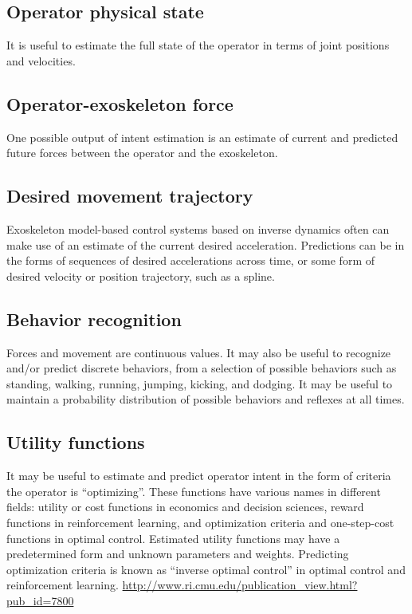\documentclass[letterpaper,12pt,fullpage]{article}
\begin{document}
\subsection{Operator physical state}

It is useful to estimate the full state of the operator in terms
of joint positions and velocities.

\subsection{Operator-exoskeleton force}

One possible output of intent estimation is an estimate of current
and predicted future forces between the operator and the exoskeleton.

\subsection{Desired movement trajectory}

Exoskeleton model-based control systems based on inverse dynamics often
can make use of an estimate of the current desired acceleration.
Predictions can be in the forms of sequences of desired accelerations
across time, or some form of desired velocity or position trajectory,
such as a spline.

\subsection{Behavior recognition}

Forces and movement are continuous values. It may also be useful to
recognize and/or predict discrete behaviors, from a selection of
possible behaviors such as 
standing, walking,
running, jumping, kicking, and dodging.
It may be useful to maintain a probability distribution of possible
behaviors and reflexes at all times.

\subsection{Utility functions}

It may be useful to estimate and predict operator intent in the form
of criteria the operator is ``optimizing''. These functions have
various names in different fields: utility or cost functions in economics
and decision sciences,
reward functions in reinforcement learning, and
optimization criteria and one-step-cost functions in optimal control.
Estimated utility functions may have a predetermined form and unknown
parameters and weights.
Predicting optimization criteria is known as ``inverse optimal control''
in optimal control and reinforcement learning.
\url{http://www.ri.cmu.edu/publication_view.html?pub_id=7800}
\end{document}
